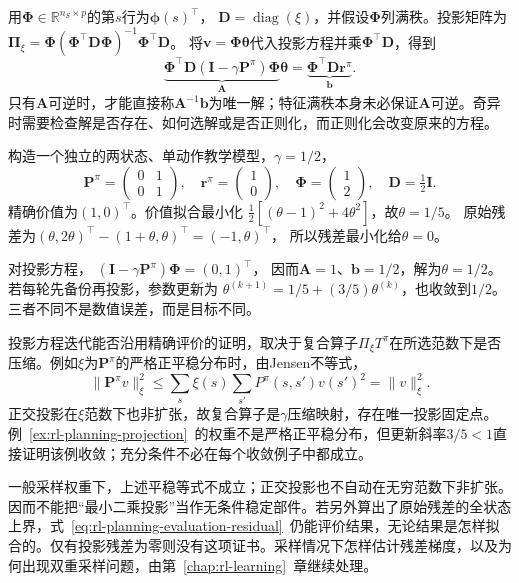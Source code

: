 用$\bm\Phi\in\mathbb R^{n_S\times p}$的第$s$行为$\bm\phi(s)^\top$，
$\bm D=\operatorname{diag}(\xi)$，并假设$\bm\Phi$列满秩。投影矩阵为
$\bm\Pi_\xi=\bm\Phi(\bm\Phi^\top\bm D\bm\Phi)^{-1}\bm\Phi^\top\bm D$。
将$\bm v=\bm\Phi\bm\theta$代入投影方程并乘$\bm\Phi^\top\bm D$，得到
\begin{equation}
 \underbrace{\bm\Phi^\top\bm D(\bm I-\gamma\bm P^\pi)\bm\Phi}_{\bm A}
 \bm\theta
 =\underbrace{\bm\Phi^\top\bm D\bm r^\pi}_{\bm b}.
 \label{eq:rl-planning-projected-system}
\end{equation}
只有$\bm A$可逆时，才能直接称$\bm A^{-1}\bm b$为唯一解；特征满秩本身未必保证$\bm A$可逆。奇异时需要检查解是否存在、如何选解或是否正则化，而正则化会改变原来的方程。

\begin{example}[同一特征的三种答案]
 \label{ex:rl-planning-projection}
 构造一个独立的两状态、单动作教学模型，$\gamma=1/2$，
 \[
 \bm P^\pi=\begin{pmatrix}0&1\\0&1\end{pmatrix},\quad
 \bm r^\pi=\begin{pmatrix}1\\0\end{pmatrix},\quad
 \bm\Phi=\begin{pmatrix}1\\2\end{pmatrix},\quad
 \bm D=\tfrac12\bm I.
 \]
 精确价值为$(1,0)^\top$。价值拟合最小化
 $\tfrac12[(\theta-1)^2+4\theta^2]$，故$\theta=1/5$。
 原始残差为$(\theta,2\theta)^\top-(1+\theta,\theta)^\top=(-1,\theta)^\top$，
 所以残差最小化给$\theta=0$。

 对投影方程，
 $(\bm I-\gamma\bm P^\pi)\bm\Phi=(0,1)^\top$，
 因而$\bm A=1$、$\bm b=1/2$，解为$\theta=1/2$。
 若每轮先备份再投影，参数更新为
 $\theta^{(k+1)}=1/5+(3/5)\theta^{(k)}$，也收敛到$1/2$。
 三者不同不是数值误差，而是目标不同。
\end{example}

投影方程迭代能否沿用精确评价的证明，取决于复合算子$\Pi_\xi T^\pi$在所选范数下是否压缩。例如$\xi$为$\bm P^\pi$的严格正平稳分布时，由Jensen不等式，
\[
 \lVert\bm P^\pi v\rVert_\xi^2
 \leq\sum_s\xi(s)\sum_{s'}P^\pi(s,s')v(s')^2
 =\lVert v\rVert_\xi^2.
\]
正交投影在$\xi$范数下也非扩张，故复合算子是$\gamma$压缩映射，存在唯一投影固定点。例~\ref{ex:rl-planning-projection}~的权重不是严格正平稳分布，但更新斜率$3/5<1$直接证明该例收敛；充分条件不必在每个收敛例子中都成立。

一般采样权重下，上述平稳等式不成立；正交投影也不自动在无穷范数下非扩张。因而不能把“最小二乘投影”当作无条件稳定部件。若另外算出了原始残差的全状态上界，式~\eqref{eq:rl-planning-evaluation-residual}~仍能评价结果，无论结果是怎样拟合的。仅有投影残差为零则没有这项证书。采样情况下怎样估计残差梯度，以及为何出现双重采样问题，由第~\ref{chap:rl-learning}~章继续处理。

